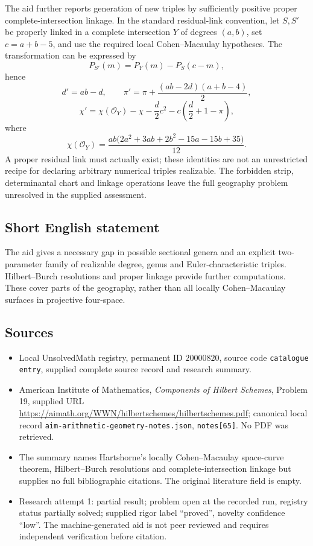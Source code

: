 \documentclass[11pt]{article}
\begin{document}
The aid further reports generation of new triples by sufficiently positive proper complete-intersection linkage. In the standard residual-link convention, let $S,S'$ be properly linked in a complete intersection $Y$ of degrees $(a,b)$, set $c=a+b-5$, and use the required local Cohen--Macaulay hypotheses. The transformation can be expressed by
\[
 P_{S'}(m)=P_Y(m)-P_S(c-m),
\]
hence
\[
 d'=ab-d,\qquad
 \pi'=\pi+\frac{(ab-2d)(a+b-4)}2,
\]
\[
 \chi'=\chi(\mathcal O_Y)-\chi-\frac d2c^2-c\left(\frac d2+1-\pi\right),
\]
where
\[
 \chi(\mathcal O_Y)=\frac{ab\bigl(2a^2+3ab+2b^2-15a-15b+35\bigr)}{12}.
\]
A proper residual link must actually exist; these identities are not an unrestricted recipe for declaring arbitrary numerical triples realizable. The forbidden strip, determinantal chart and linkage operations leave the full geography problem unresolved in the supplied assessment.
\subsection{Short English statement}
The aid gives a necessary gap in possible sectional genera and an explicit two-parameter family of realizable degree, genus and Euler-characteristic triples. Hilbert--Burch resolutions and proper linkage provide further computations. These cover parts of the geography, rather than all locally Cohen--Macaulay surfaces in projective four-space.
\subsection{Sources}
\begin{itemize}
\item Local UnsolvedMath registry, permanent ID $20000820$, source code \texttt{catalogue entry}, supplied complete source record and research summary.
\item American Institute of Mathematics, \emph{Components of Hilbert Schemes}, Problem 19, supplied URL \url{https://aimath.org/WWN/hilbertschemes/hilbertschemes.pdf}; canonical local record \texttt{aim-arithmetic-geometry-notes.json}, \texttt{notes[65]}. No PDF was retrieved.
\item The summary names Hartshorne's locally Cohen--Macaulay space-curve theorem, Hilbert--Burch resolutions and complete-intersection linkage but supplies no full bibliographic citations. The original literature field is empty.
\item Research attempt 1: partial result; problem open at the recorded run, registry status partially solved; supplied rigor label ``proved'', novelty confidence ``low''. The machine-generated aid is not peer reviewed and requires independent verification before citation.
\end{itemize}
\end{document}

